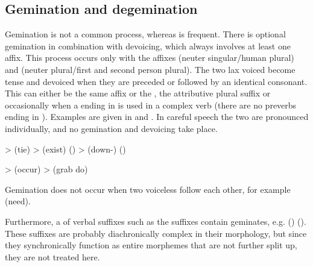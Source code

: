 \subsection{Gemination and degemination}
\label{ssec:Gemination and degemination}
Gemination is not a common process, whereas  is frequent. There is optional gemination in combination with devoicing, which always involves at least one  affix. This process occurs only with the  affixes  (neuter singular\slash human plural) and  (neuter plural\slash first and second person plural). The two lax voiced  become tense and devoiced when they are preceded or followed by an identical consonant. This can either be the same  affix or the   , the attributive plural suffix  or occasionally when a  ending in  is used in a complex verb (there are no preverbs ending in ). Examples are given in  and . In careful speech the two  are pronounced individually, and no gemination and devoicing take place.
%
\begin{exe}
	\label{ex:d dt t phon}
	\begin{xlist}
		\ex	{} >   (tie)
		\ex	{} >   (exist) ()
		\ex	{} >   (down-) ()
	\end{xlist}

	\label{ex:bp b p phon}
	\begin{xlist}
		\ex	{} >   (occur\tsc{.pfv-pret})
		\ex	{} >   (grab do\tsc{.pfv-pret})
	\end{xlist}
\end{exe}

Gemination does not occur when two voiceless  follow each other, for example  (need).

Furthermore, a  of verbal suffixes such as the  suffixes contain geminates, e.g.  () (). These suffixes are probably diachronically complex in their morphology, but since they synchronically function as entire morphemes that are not further split up, they are not treated here.


